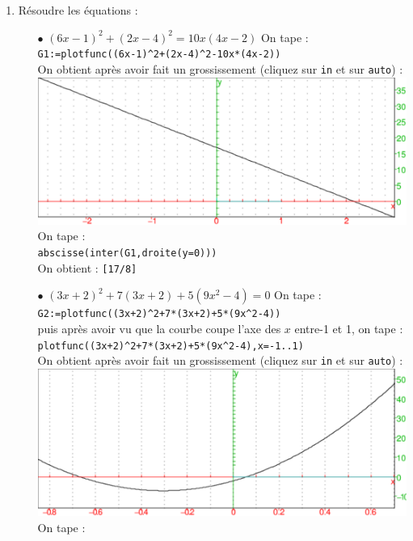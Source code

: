 \documentclass[a4paper,11pt]{book}
\begin{document}
\begin{enumerate}
\item R\'esoudre les \'equations :
\begin{itemize}
\item[$\bullet$] $(6x-1)^2+(2x-4)^2=10x(4x-2)$
On tape :\\
{\tt G1:=plotfunc((6x-1)\verb|^|2+(2x-4)\verb|^|2-10x*(4x-2))}\\
On obtient apr\`es avoir fait un grossissement (cliquez sur {\tt in} et sur {\tt auto}) :\\
\includegraphics[width=\textwidth]{equagraph1}\\
On tape :\\
{\tt abscisse(inter(G1,droite(y=0)))}\\
On obtient :
{\tt [17/8]}
\item[$\bullet$] $(3x+2)^2+7(3x+2)+5(9x^2-4)=0$
On tape :\\
{\tt G2:=plotfunc((3x+2)\verb|^|2+7*(3x+2)+5*(9x\verb|^|2-4))}\\
puis apr\`es avoir vu que la courbe coupe l'axe des $x$ entre-1 et 1, on tape :\\
{\tt plotfunc((3x+2)\verb|^|2+7*(3x+2)+5*(9x\verb|^|2-4),x=-1..1)}\\
On obtient apr\`es avoir fait un grossissement (cliquez sur {\tt in} et sur {\tt auto}) :\\
\includegraphics[width=\textwidth]{equagraph2}\\
On tape :\\

\end{itemize}
\end{enumerate}
\end{document}
